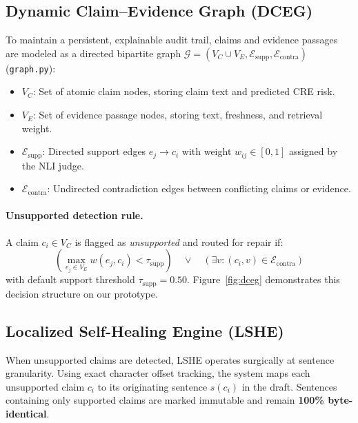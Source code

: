 \subsection{Dynamic Claim--Evidence Graph (DCEG)}
To maintain a persistent, explainable audit trail, claims and evidence passages are modeled as a directed bipartite graph $\mathcal{G} = (V_C \cup V_E, \mathcal{E}_{\text{supp}}, \mathcal{E}_{\text{contra}})$ (\texttt{graph.py}):
\begin{itemize}
  \item $V_C$: Set of atomic claim nodes, storing claim text and predicted CRE risk.
  \item $V_E$: Set of evidence passage nodes, storing text, freshness, and retrieval weight.
  \item $\mathcal{E}_{\text{supp}}$: Directed support edges $e_j \rightarrow c_i$ with weight $w_{ij} \in [0, 1]$ assigned by the NLI judge.
  \item $\mathcal{E}_{\text{contra}}$: Undirected contradiction edges between conflicting claims or evidence.
\end{itemize}

\paragraph{Unsupported detection rule.}
A claim $c_i \in V_C$ is flagged as \emph{unsupported} and routed for repair if:
\begin{equation}
  \left( \max_{e_j \in V_E} w(e_j, c_i) < \tau_{\text{supp}} \right) \quad \lor \quad \left( \exists v : (c_i, v) \in \mathcal{E}_{\text{contra}} \right)
\end{equation}
with default support threshold $\tau_{\text{supp}} = 0.50$. Figure~\ref{fig:dceg} demonstrates this decision structure on our prototype.

\subsection{Localized Self-Healing Engine (LSHE)}
When unsupported claims are detected, LSHE operates surgically at sentence granularity. Using exact character offset tracking, the system maps each unsupported claim $c_i$ to its originating sentence $s(c_i)$ in the draft. Sentences containing only supported claims are marked immutable and remain \textbf{100\% byte-identical}.

